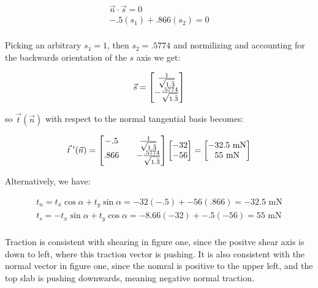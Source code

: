 \documentclass{article}
\newcommand{\overbar}[1]{\mkern 1.5mu\overline{\mkern-1.5mu#1\mkern-1.5mu}\mkern 1.5mu}
\begin{document}
\begin{gather*}
  \vec{n} \cdot \vec{s} = 0\\
  -.5(s_1) + .866(s_2) = 0\\
\end{gather*}

Picking an arbitrary $s_1 = 1$, then $s_2 = .5774$ and normilizing and accounting for the backwards orientation of the $s$ axis we get:

$$\vec{s} =
\begin{bmatrix}
  \frac{1}{\sqrt{1.\overbar{3}}}\\[4pt]
  -\frac{.5774}{\sqrt{1.\overbar{3}}}\\
\end{bmatrix}
  $$

so $\vec{t}(\vec{n})$ with respect to the normal tangential basis becomes:

$$\vec{t}^{\text{ }\prime}(\vec{n}) =
\begin{bmatrix}
  -.5 &&  \frac{1}{\sqrt{1.\overbar{3}}}\\[4pt]
  .866 && -\frac{.5774}{\sqrt{1.\overbar{3}}}\\
\end{bmatrix}
\begin{bmatrix}
  -32\\
  -56\\
\end{bmatrix}
=
\begin{bmatrix}
  -32.5 \text{ mN}\\
  55 \text{ mN}\\
\end{bmatrix}
  $$

Alternatively, we have:

\begin{gather*}
  t_n = t_x\cos\alpha + t_y\sin\alpha = -32(-.5) + -56(.866) = -32.5 \text{ mN}\\
  t_s = -t_x\sin\alpha + t_y\cos\alpha = -8.66(-32) + -.5(-56) = 55 \text{ mN}\\
\end{gather*}

Traction is consistent with shearing in figure one, since the positve shear axis is down to left, where this traction vector is pushing. It is also consistent with the normal vector in figure one, since the nomral is positive to the upper left, and the top slab is pushing downwards, meaning negative normal traction.

\vspace{3mm}
\end{document}
